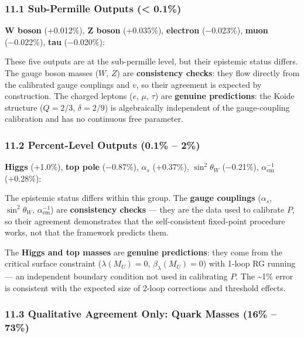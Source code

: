 \subsubsection{11.1 Sub-Permille Outputs (\textless{} 0.1\%)}\label{111-sub-permille-outputs--01}

\textbf{W boson} (+0.012\%), \textbf{Z boson} (+0.035\%), \textbf{electron} (−0.023\%), \textbf{muon} (−0.022\%), \textbf{tau} (−0.020\%):

These five outputs are at the sub-permille level, but their epistemic status differs. The gauge boson masses (\(W\), \(Z\)) are \textbf{consistency checks}: they flow directly from the calibrated gauge couplings and \(v\), so their agreement is expected by construction. The charged leptons (\(e\), \(\mu\), \(\tau\)) are \textbf{genuine predictions}: the Koide structure (\(Q = 2/3\), \(\delta = 2/9\)) is algebraically independent of the gauge-coupling calibration and has no continuous free parameter.

\subsubsection{11.2 Percent-Level Outputs (0.1\% -- 2\%)}\label{112-percent-level-outputs-01--2}

\textbf{Higgs} (+1.0\%), \textbf{top pole} (−0.87\%), \textbf{\(\alpha_s\)} (+0.37\%), \textbf{\(\sin^2\theta_W\)} (−0.21\%), \textbf{\(\alpha_{\text{em}}^{-1}\)} (+0.28\%):

The epistemic status differs within this group. The \textbf{gauge couplings} (\(\alpha_s\), \(\sin^2\theta_W\), \(\alpha_{\text{em}}^{-1}\)) are \textbf{consistency checks} --- they are the data used to calibrate \(P\), so their agreement demonstrates that the self-consistent fixed-point procedure works, not that the framework predicts them.

The \textbf{Higgs and top masses} are \textbf{genuine predictions}: they come from the critical surface constraint (\(\lambda(M_U) = 0\), \(\beta_\lambda(M_U) = 0\)) with 1-loop RG running --- an independent boundary condition not used in calibrating \(P\). The \textasciitilde1\% error is consistent with the expected size of 2-loop corrections and threshold effects.

\subsubsection{11.3 Qualitative Agreement Only: Quark Masses (16\% -- 73\%)}\label{113-qualitative-agreement-only-quark-masses-16--73}

